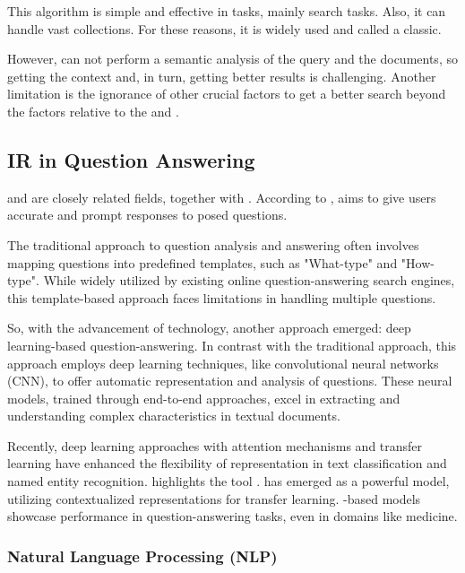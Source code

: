 This algorithm is simple and effective in {\ir} tasks, mainly search tasks. Also, it can handle vast collections. For these reasons, it is widely used and called a classic.

However, {\bm} can not perform a semantic analysis of the query and the documents, so getting the context and, in turn, getting better results is challenging. Another limitation is the ignorance of other crucial factors to get a better search beyond the factors relative to the {\tf} and {\dl}.


\subsection{IR in Question Answering}

{\qa} and {\ir} are closely related fields, together with {\nlp}. According to \citet{zhong_building_2020}, {\qa} aims to give users accurate and prompt responses to posed questions.

The traditional approach to question analysis and answering often involves mapping questions into predefined templates, such as "What-type" and "How-type". While widely utilized by existing online question-answering search engines, this template-based approach faces limitations in handling multiple questions. 

So, with the advancement of technology, another approach emerged: deep learning-based question-answering. In contrast with the traditional approach, this approach employs deep learning techniques, like convolutional neural networks (CNN), to offer automatic representation and analysis of questions. These neural models, trained through end-to-end approaches, excel in extracting and understanding complex characteristics in textual documents.

Recently, deep learning approaches with attention mechanisms and transfer learning have enhanced the flexibility of representation in text classification and named entity recognition. \citet{zhong_building_2020} highlights the tool {\bert}. {\bert} has emerged as a powerful model, utilizing contextualized representations for transfer learning. {\bert}-based models showcase performance in question-answering tasks, even in domains like medicine.



\subsubsection{Natural Language Processing (NLP)}

